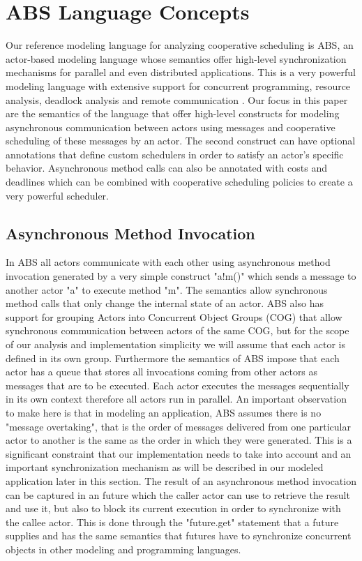 

\section{ABS Language Concepts}
\label{lang}
Our reference modeling language for analyzing cooperative scheduling is ABS\cite{abs}, an actor-based modeling language whose semantics offer high-level synchronization mechanisms for parallel and even distributed applications. This is a very powerful modeling language with extensive support for concurrent programming\cite{cog}, resource analysis\cite{saco}, deadlock analysis\cite{dead} and remote communication \cite{dis,cloud}. Our focus in this paper are the semantics of the language that offer high-level constructs for modeling asynchronous communication between actors using messages and cooperative scheduling of these messages by an actor.  The second construct can have optional annotations that define custom schedulers in order to satisfy an actor's specific behavior. Asynchronous method calls can also be annotated with costs and deadlines which can be combined with cooperative scheduling policies to create a very powerful scheduler.

\subsection{Asynchronous Method Invocation}\label{amc}
In ABS all actors communicate with each other using asynchronous method invocation generated by a very simple construct "a!m()" which sends a message to another actor "a" to execute method "m". The semantics allow synchronous method calls that only change the internal state of an actor. ABS also has support for grouping Actors into Concurrent Object Groups (COG) that allow synchronous communication between actors of the same COG, but for the scope of our analysis and implementation simplicity we will assume that each actor is defined in its own group. Furthermore the semantics of ABS impose that each actor has a queue that stores all invocations coming from other actors as messages that are to be executed. Each actor executes the messages sequentially in its own context therefore all actors run in parallel.  An important observation to make here is that in modeling an application, ABS assumes there is no "message overtaking", that is the order of messages delivered from one particular actor to another is the same as the order in which they were generated. This is a significant constraint that our implementation needs to take into account and an important synchronization mechanism as will be described in our modeled application later in this section. The result of an asynchronous method invocation can be captured in an future which the caller actor can use to retrieve the result and use it, but also to block its current execution in order to synchronize with the callee actor. This is done through the "future.get" statement that a future supplies and has the same semantics that futures have to synchronize concurrent objects in other modeling and programming languages.  

